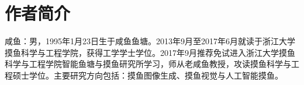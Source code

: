 
\ifanon
\else
\chapter{作者简介}
\label{cha:resume}

咸鱼：男，1995年1月23日生于咸鱼鱼塘。2013年9月至2017年6月就读于浙江大学摸鱼科学与工程学院，获得工学学士学位。2017年9月推荐免试进入浙江大学摸鱼科学与工程学院智能鱼塘与摸鱼研究所学习，师从老咸鱼教授，攻读摸鱼科学与工程硕士学位。主要研究方向包括：摸鱼图像生成、摸鱼视觉与人工智能摸鱼。

\fi
